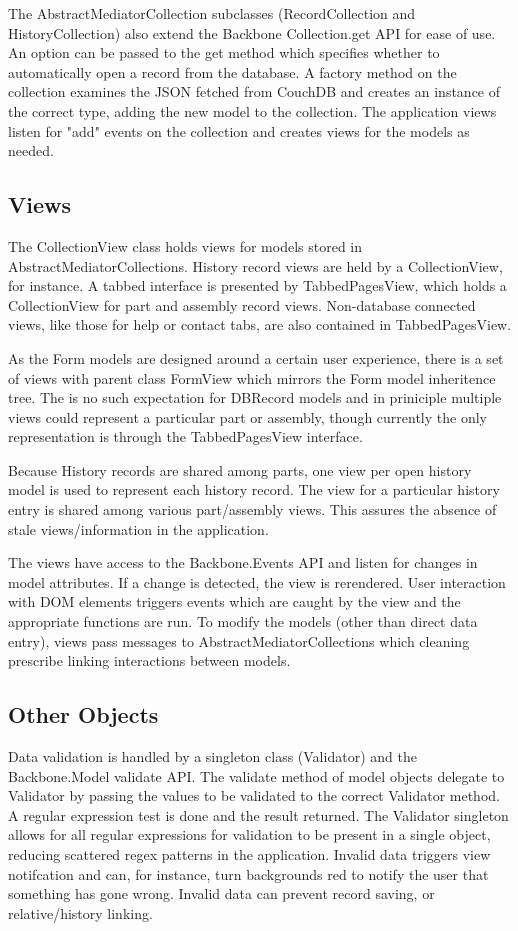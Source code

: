 \documentclass[journal]{IEEEtran}
\begin{document}
The AbstractMediatorCollection subclasses (RecordCollection and HistoryCollection) also extend the
Backbone Collection.get API for ease of use. An option can be passed to the get method which
specifies whether to automatically open a record from the database.
A factory method on the collection examines the JSON
fetched from CouchDB and creates an instance of the correct type, adding the new model
to the collection. The application views listen for "add" events on the collection and creates views
for the models as needed.

\subsection{Views}

The CollectionView class holds views for models stored in AbstractMediatorCollections. History record 
views are held by a CollectionView, for instance. A tabbed interface is presented by TabbedPagesView,
which holds a CollectionView for part and assembly record views. Non-database connected views, like those
for help or contact tabs, are also contained in TabbedPagesView.

As the Form models are designed around a certain user experience, there is a set of views with parent class
FormView which mirrors the Form model inheritence tree. The is no such expectation for DBRecord models and
in priniciple multiple views could represent a particular part or assembly, though currently the only representation is
through the TabbedPagesView interface.

Because History records are shared among parts, one view per open history model is used to represent each history
record. The view for a particular history entry is shared among various part/assembly views. This assures the absence of
stale views/information in the application.

The views have access to the Backbone.Events API and listen for changes in model attributes. If a change is detected,
the view is rerendered. User interaction with DOM elements triggers events which are caught by the view and the appropriate
functions are run. To modify the models (other than direct data entry), views pass messages to AbstractMediatorCollections
which cleaning prescribe linking interactions between models.

\subsection{Other Objects}
Data validation is handled by a singleton class (Validator) and the Backbone.Model validate API. The validate
method of model objects delegate to Validator by passing the values to be validated to the correct
Validator method. A regular expression test is done and the result returned. The Validator singleton
allows for all regular expressions for validation to be present in a single object, reducing scattered
regex patterns in the application. Invalid data triggers view notifcation and can, for instance, turn backgrounds 
red to notify the user that something has gone wrong. Invalid data can prevent record saving, or relative/history linking.
\end{document}
